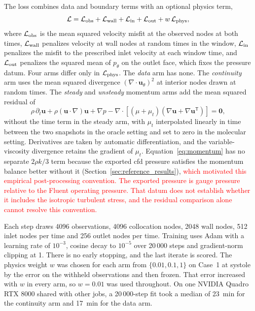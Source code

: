 \documentclass[12pt,a4paper]{article}
\newcommand{\cfdrevision}[1]{\textcolor{red}{#1}}
\newcommand{\CFD}{\ac{cfd}\xspace}
\theoremstyle{definition}
\numberwithin{equation}{section}
\newcommand{\revision}[1]{\textcolor{red}{#1}}
\begin{document}
The loss combines data and boundary terms with an optional physics term,
\begin{equation}
\mathcal L=\mathcal L_{\rm obs}+\mathcal L_{\rm wall}+\mathcal L_{\rm in}+\mathcal L_{\rm out}+w\,\mathcal L_{\rm phys},
\label{eq:loss}
\end{equation}
where $\mathcal L_{\rm obs}$ is the mean squared velocity misfit at the observed nodes at both times, $\mathcal L_{\rm wall}$ penalizes velocity at wall nodes at random times in the window, $\mathcal L_{\rm in}$ penalizes the misfit to the prescribed inlet velocity at each window time, and $\mathcal L_{\rm out}$ penalizes the squared mean of $p_\theta$ on the outlet face, which fixes the pressure datum. Four arms differ only in $\mathcal L_{\rm phys}$. The \emph{data} arm has none. The \emph{continuity} arm uses the mean squared divergence $(\nabla\cdot\mathbf u_\theta)^2$ at interior nodes drawn at random times. The \emph{steady} and \emph{unsteady} momentum arms add the mean squared residual of
\begin{equation}
\rho\,\partial_t\mathbf u+\rho(\mathbf u\cdot\nabla)\mathbf u
+\nabla p-\nabla\cdot\left[(\mu+\mu_t)
(\nabla\mathbf u+\nabla\mathbf u^{\mathsf T})\right]=\mathbf 0,
\label{eq:momentum}
\end{equation}
without the time term in the steady arm, with $\mu_t$ interpolated linearly in time between the two snapshots in the oracle setting and set to zero in the molecular setting. Derivatives are taken by automatic differentiation, and the variable-viscosity divergence retains the gradient of $\mu_t$. Equation~\eqref{eq:momentum} has no separate $2\rho k/3$ term because the exported \CFD pressure satisfies the momentum balance better without it (Section~\ref{sec:reference_results}),   \revision{which motivated this empirical post-processing convention. \cfdrevision{The exported pressure is gauge pressure relative to the Fluent operating pressure. That datum does not establish whether it includes the isotropic turbulent stress, and the residual comparison alone cannot resolve this convention.}
}

Each step draws 4096 observations, 4096 collocation nodes, 2048 wall nodes, 512 inlet nodes per time and 256 outlet nodes per time. Training uses Adam with a learning rate of $10^{-3}$, cosine decay to $10^{-5}$ over 20\,000 steps and gradient-norm clipping at 1. There is no early stopping, and the last iterate is scored. The physics weight $w$ was chosen for each arm from $\{0.01,0.1,1\}$ on Case~1 at systole by the error on the withheld observations and then frozen. That error increased with $w$ in every arm, so $w=0.01$ was used throughout. On one NVIDIA Quadro RTX 8000 shared with other jobs, a 20\,000-step fit took a median of 23~min for the continuity arm and 17~min for the data arm.
\end{document}
